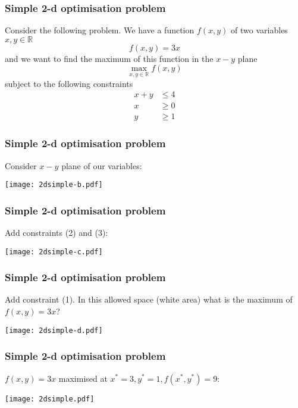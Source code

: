 \documentclass[10pt,aspectratio=169,dvipsnames]{beamer}
\begin{document}
\begin{frame}
  \frametitle{Simple 2-d optimisation problem}

  Consider the following problem. We have a function $f(x,y)$ of two variables $x,y\in \mathbb{R}$
  \begin{equation*}
    f(x,y) = 3x
  \end{equation*}
  and we want to find the maximum of this function in the $x-y$ plane
  \begin{equation*}
    \max_{x,y\in \mathbb{R}} f(x,y)
  \end{equation*}
  subject to the following constraints
  \begin{align}
    x + y & \leq 4 \\
    x & \geq 0 \\
    y & \geq 1
  \end{align}
\end{frame}


\begin{frame}
  \frametitle{Simple 2-d optimisation problem}

  Consider $x-y$ plane of our variables:

  \centering
  \texttt{[image: 2dsimple-b.pdf]}
\end{frame}



\begin{frame}
  \frametitle{Simple 2-d optimisation problem}

  Add constraints (2) and (3):

  \centering
  \texttt{[image: 2dsimple-c.pdf]}
\end{frame}


\begin{frame}
  \frametitle{Simple 2-d optimisation problem}

  Add constraint (1).   In this allowed space (white area) what is the maximum of $f(x,y) = 3x$?


  \centering
  \texttt{[image: 2dsimple-d.pdf]}
\end{frame}


\begin{frame}
  \frametitle{Simple 2-d optimisation problem}

  $f(x,y) = 3x$ maximised at $x^* = 3, y^* = 1, f(x^*, y^*) = 9$:

  \centering
  \texttt{[image: 2dsimple.pdf]}
\end{frame}
\end{document}
